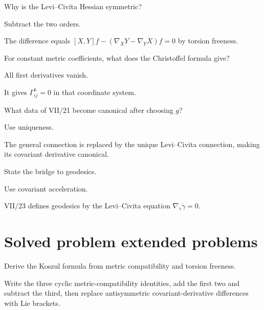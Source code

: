 \begin{exercise}\label{exr:vii22-21}
Why is the Levi--Civita Hessian symmetric?
\end{exercise}
\begin{hint}
Subtract the two orders.
\end{hint}
\begin{solution}
The difference equals \([X,Y]f-(\nabla_XY-\nabla_YX)f=0\) by torsion freeness.
\end{solution}


\begin{exercise}\label{exr:vii22-22}
For constant metric coefficients, what does the Christoffel formula give?
\end{exercise}
\begin{hint}
All first derivatives vanish.
\end{hint}
\begin{solution}
It gives \(\Gamma^k_{ij}=0\) in that coordinate system.
\end{solution}


\begin{exercise}\label{exr:vii22-23}
What data of VII/21 become canonical after choosing \(g\)?
\end{exercise}
\begin{hint}
Use uniqueness.
\end{hint}
\begin{solution}
The general connection is replaced by the unique Levi--Civita connection, making its covariant derivative canonical.
\end{solution}


\begin{exercise}\label{exr:vii22-24}
State the bridge to geodesics.
\end{exercise}
\begin{hint}
Use covariant acceleration.
\end{hint}
\begin{solution}
VII/23 defines geodesics by the Levi--Civita equation \(\nabla_{\dot\gamma}\dot\gamma=0\).
\end{solution}

\section{Solved problem extended problems}

\begin{problem}\label{prob:vii22-01}
Derive the Koszul formula from metric compatibility and torsion freeness.
\end{problem}
\begin{solution}
Write the three cyclic metric-compatibility identities, add the first two and subtract the third, then replace antisymmetric covariant-derivative differences with Lie brackets.
\end{solution}


